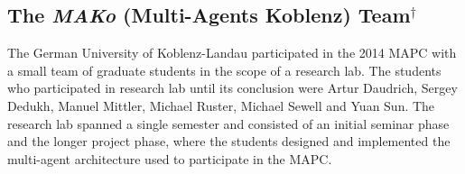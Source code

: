 \subsection[The \emph{MAKo} (Multi-Agents Koblenz) Team]{The \emph{MAKo} (Multi-Agents Koblenz) Team$^\dagger$}
The German University of Koblenz-Landau participated in the 2014 MAPC with a small team of graduate students in the scope of a research lab.
The students who participated in research lab until its conclusion were Artur Daudrich, Sergey Dedukh, Manuel Mittler, Michael Ruster, Michael Sewell and Yuan Sun.
The research lab spanned a single semester and consisted of an initial seminar phase and the longer project phase, where the students designed and implemented the multi-agent architecture used to participate in the MAPC.
